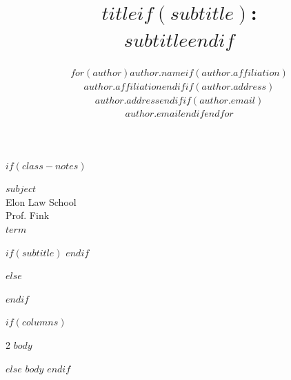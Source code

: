 \documentclass[$fontsize$,letterpaper,twoside]{article}
\title{\Large\textbf{{$title$}$if(subtitle)$:\\$subtitle$$endif$}}
\author{$for(author)${$author.name$}$if(author.affiliation)$\\$author.affiliation$$endif$$if(author.address)$\\$author.address$$endif$$if(author.email)$\\$author.email$$endif$$endfor$}
\date{}
\begin{document}
\color{OffBlack}
\singlespacing
{}

$if(class-notes)$
\thispagestyle{empty}
\begin{small}
$subject$ \\
Elon Law School \\
Prof. Fink \\
$term$ 
\end{small}
\begin{center}
$if(subtitle)$
$endif$
\end{center}
$else$
\maketitle
$endif$

$if(columns)$
\setlength{\columnsep}{3em}
\begin{multicols*}{2}
$body$
\end{multicols*}
$else$
$body$
$endif$
\end{document}
